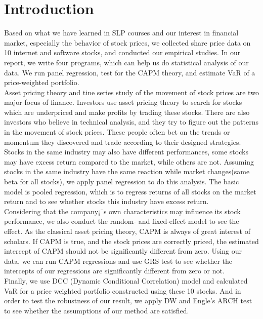 \pagestyle{empty} %

\titleGP %

    \newpage
    \pagestyle{fancy}
    \section{Introduction}

    \noindent Based on what we have learned in SLP courses and our interest in financial market, especially the behavior of stock prices, we collected share price data on 10 internet and software stocks, and conducted our empirical studies.
In our report, we write four programs, which can help us do statistical analysis of our data. We run panel regression, test for the CAPM theory, and estimate VaR of a price-weighted portfolio.\\
[\baselineskip]\indent Asset pricing theory and tine series study of the movement of stock prices are two major focus of finance. Investors use asset pricing theory to search for stocks which are underpriced and make profits by trading these stocks. There are also investors who believe in technical analysis, and they try to figure out the patterns in the movement of stock prices. These people often bet on the trends or momentum they discovered and trade according to their designed strategies.\\
[\baselineskip] \indent Stocks in the same industry may also have different performances, some stocks may have excess return compared to the market, while others are not. Assuming stocks in the same industry have the same reaction while market changes(same beta for all stocks), we apply panel regression to do this analysis. The basic model is pooled regression, which is to regress returns of all stocks on the market return and to see whether stocks this industry have excess return.\\
[\baselineskip] \indent Considering that the company¡¯s own characteristics may influence its stock performance, we also conduct the random- and fixed-effect model to see the effect.
 As the classical asset pricing theory, CAPM is always of great interest of scholars. If CAPM is true, and the stock prices are correctly priced, the estimated intercept of CAPM should not be significantly different from zero. Using our data, we can run CAPM regressions and use GRS test to see whether the intercepts of our regressions are significantly different from zero or not.\\
[\baselineskip] \indent Finally, we use DCC (Dynamic Conditional Correlation) model and calculated VaR for a price weighted portfolio constructed using these 10 stocks. And in order to test the robustness of our result, we apply DW and Engle's ARCH test to see whether the assumptions of our method are satisfied.

